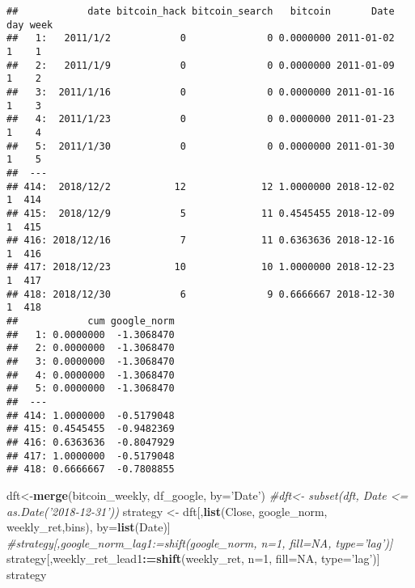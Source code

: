 \documentclass[
]{article}
\newenvironment{Shaded}{\begin{snugshade}}{\end{snugshade}}
\newcommand{\CommentTok}[1]{\textcolor[rgb]{0.56,0.35,0.01}{\textit{#1}}}
\newcommand{\DataTypeTok}[1]{\textcolor[rgb]{0.13,0.29,0.53}{#1}}
\newcommand{\DecValTok}[1]{\textcolor[rgb]{0.00,0.00,0.81}{#1}}
\newcommand{\ErrorTok}[1]{\textcolor[rgb]{0.64,0.00,0.00}{\textbf{#1}}}
\newcommand{\KeywordTok}[1]{\textcolor[rgb]{0.13,0.29,0.53}{\textbf{#1}}}
\newcommand{\NormalTok}[1]{#1}
\newcommand{\OperatorTok}[1]{\textcolor[rgb]{0.81,0.36,0.00}{\textbf{#1}}}
\newcommand{\OtherTok}[1]{\textcolor[rgb]{0.56,0.35,0.01}{#1}}
\newcommand{\StringTok}[1]{\textcolor[rgb]{0.31,0.60,0.02}{#1}}
\begin{document}
\begin{verbatim}
##            date bitcoin_hack bitcoin_search   bitcoin       Date day week
##   1:   2011/1/2            0              0 0.0000000 2011-01-02   1    1
##   2:   2011/1/9            0              0 0.0000000 2011-01-09   1    2
##   3:  2011/1/16            0              0 0.0000000 2011-01-16   1    3
##   4:  2011/1/23            0              0 0.0000000 2011-01-23   1    4
##   5:  2011/1/30            0              0 0.0000000 2011-01-30   1    5
##  ---                                                                     
## 414:  2018/12/2           12             12 1.0000000 2018-12-02   1  414
## 415:  2018/12/9            5             11 0.4545455 2018-12-09   1  415
## 416: 2018/12/16            7             11 0.6363636 2018-12-16   1  416
## 417: 2018/12/23           10             10 1.0000000 2018-12-23   1  417
## 418: 2018/12/30            6              9 0.6666667 2018-12-30   1  418
##            cum google_norm
##   1: 0.0000000  -1.3068470
##   2: 0.0000000  -1.3068470
##   3: 0.0000000  -1.3068470
##   4: 0.0000000  -1.3068470
##   5: 0.0000000  -1.3068470
##  ---                      
## 414: 1.0000000  -0.5179048
## 415: 0.4545455  -0.9482369
## 416: 0.6363636  -0.8047929
## 417: 1.0000000  -0.5179048
## 418: 0.6666667  -0.7808855
\end{verbatim}

\begin{Shaded}
\begin{Highlighting}[]
\NormalTok{dft<-}\KeywordTok{merge}\NormalTok{(bitcoin_weekly, df_google, }\DataTypeTok{by=}\StringTok{'Date'}\NormalTok{)}
\CommentTok{#dft<- subset(dft, Date <= as.Date('2018-12-31'))}
\NormalTok{strategy <-}\StringTok{ }\NormalTok{dft[,}\KeywordTok{list}\NormalTok{(Close, google_norm, weekly_ret,bins), by=}\KeywordTok{list}\NormalTok{(Date)]}
\CommentTok{#strategy[,google_norm_lag1:=shift(google_norm, n=1, fill=NA, type='lag')]}
\NormalTok{strategy[,weekly_ret_lead1}\OperatorTok{:}\ErrorTok{=}\KeywordTok{shift}\NormalTok{(weekly_ret, }\DataTypeTok{n=}\DecValTok{1}\NormalTok{, }\DataTypeTok{fill=}\OtherTok{NA}\NormalTok{, }\DataTypeTok{type=}\StringTok{'lag'}\NormalTok{)]}
\NormalTok{strategy}
\end{Highlighting}
\end{Shaded}
\end{document}
